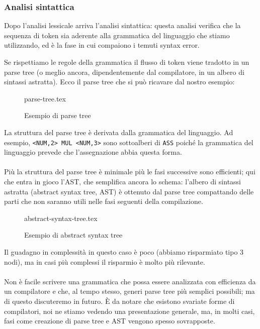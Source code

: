 \documentclass[class=book, crop=false, oneside, 12pt]{standalone}
\begin{document}
\subsubsection{Analisi sintattica}
Dopo l’analisi lessicale arriva l’analisi sintattica: questa analisi verifica che la sequenza di token sia aderente alla grammatica del linguaggio che stiamo utilizzando, ed è la fase in cui compaiono i temuti syntax error.

Se rispettiamo le regole della grammatica il flusso di token viene tradotto in un parse tree (o meglio ancora, dipendentemente dal compilatore, in un albero di sintassi astratta). Ecco il parse tree che si può ricavare dal nostro esempio:
\begin{figure}[H]
	\centering
	{parse-tree.tex}
	\caption{Esempio di parse tree}
\end{figure}
La struttura del parse tree è derivata dalla grammatica del linguaggio. Ad esempio, \texttt{<NUM,2> MUL <NUM,3>} sono sottoalberi di \texttt{ASS} poiché la grammatica del linguaggio prevede che l’assegnazione abbia questa forma. 

\paragraph{}
Più la struttura del parse tree è minimale più le fasi successive sono efficienti; qui che entra in gioco l’AST, che semplifica ancora lo schema: l’albero di sintassi astratta (abstract syntax tree, AST) è ottenuto dal parse tree compattando delle parti che non saranno utili nelle fasi seguenti della compilazione.
\begin{figure}[H]
	\centering
	{abstract-syntax-tree.tex}
	\caption{Esempio di abstract syntax tree}
	\label{esempio_AST}
\end{figure}
Il guadagno in complessità in questo caso è poco (abbiamo risparmiato tipo 3 nodi), ma in casi più complessi il risparmio è molto più rilevante.
\paragraph*{}
Non è facile scrivere una grammatica che possa essere analizzata con efficienza da un compilatore e che, al tempo stesso, generi parse tree più semplici possibili; ma di questo discuteremo in futuro. È da notare che esistono svariate forme di compilatori, noi ne stiamo vedendo una presentazione generale, ma, in molti casi, fasi come creazione di parse tree e AST vengono spesso sovrapposte.
\end{document}
